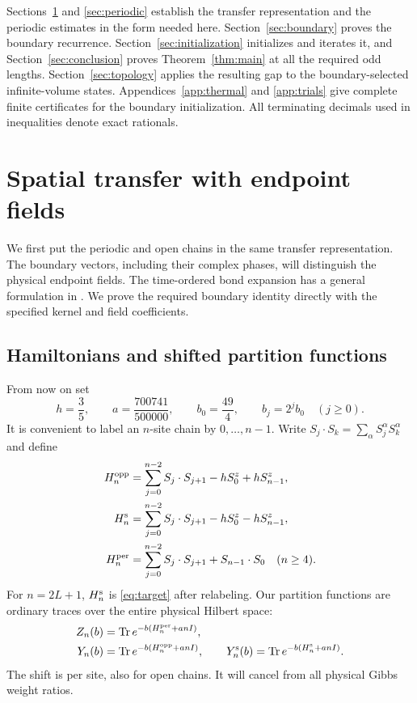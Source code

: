 \documentclass[11pt]{article}
\theoremstyle{remark}
\numberwithin{equation}{section}
\begin{document}
Sections~\ref{sec:transfer} and \ref{sec:periodic} establish the transfer
representation and the periodic estimates in the form needed here.
Section~\ref{sec:boundary} proves the boundary recurrence.
Section~\ref{sec:initialization} initializes and iterates it, and
Section~\ref{sec:conclusion} proves Theorem~\ref{thm:main} at all the
required odd lengths. Section~\ref{sec:topology} applies the resulting
gap to the boundary-selected infinite-volume states.
Appendices~\ref{app:thermal} and \ref{app:trials}
give complete finite certificates for the boundary initialization.
All terminating decimals used in inequalities denote exact rationals.

\section{Spatial transfer with endpoint fields}\label{sec:transfer}
We first put the periodic and open chains in the same transfer
representation. The boundary vectors, including their complex phases,
will distinguish the physical endpoint fields.
The time-ordered bond expansion has a general formulation in
\cite[arXiv v1, Section 2.2, Equations (2.10)--(2.12)]{AizenmanNachtergaele1994}.
We prove the required boundary identity directly with the specified
kernel and field coefficients.

\subsection{Hamiltonians and shifted partition functions}
From now on set
\begin{equation}\label{tr:constants}
 h=\frac35,\qquad a=\frac{700741}{500000},\qquad
 b_0=\frac{49}{4},\qquad b_j=2^jb_0\quad(j\ge0).
\end{equation}
It is convenient to label an $n$-site chain by $0,\ldots,n-1$.
Write $S_j\cdot S_k=\sum_\alpha S_j^\alpha S_k^\alpha$ and define
\begin{align}
 H_n^{\rm opp}&=\sum_{j=0}^{n-2}S_j\cdot S_{j+1}
                         -hS_0^z+hS_{n-1}^z,\label{tr:Hopp}\\
 H_n^{\rm s}&=\sum_{j=0}^{n-2}S_j\cdot S_{j+1}
                         -hS_0^z-hS_{n-1}^z,\label{tr:Hsame}\\
 H_n^{\rm per}&=\sum_{j=0}^{n-2}S_j\cdot S_{j+1}
                         +S_{n-1}\cdot S_0\quad(n\ge4).
\end{align}
For $n=2L+1$, $H_n^{\rm s}$ is \eqref{eq:target} after relabeling.
Our partition functions are ordinary traces over the entire physical
Hilbert space:
\begin{equation}\label{tr:partitions}
 \begin{split}
 Z_n(b)&=\operatorname{Tr} e^{-b(H_n^{\rm per}+an I)},\\
 Y_n(b)&=\operatorname{Tr} e^{-b(H_n^{\rm opp}+an I)},\qquad
 Y_n^{\rm s}(b)=\operatorname{Tr} e^{-b(H_n^{\rm s}+an I)}.
 \end{split}
\end{equation}
The shift is per site, also for open chains. It will cancel from all
physical Gibbs weight ratios.
\end{document}
